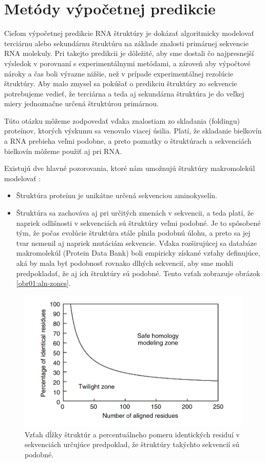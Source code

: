 \chapter{Metódy výpočetnej predikcie}
Cieľom výpočetnej predikcie RNA štruktúry je dokázať algoritmicky modelovať terciárnu alebo sekundárnu štruktúru na základe znalosti primárnej sekvencie RNA molekuly. Pri takejto predikcii je dôležité, aby sme dostali čo najpresnejší výsledok v porovnaní s experimentálnymi metódami, a zároveň aby výpočtové nároky a čas boli výrazne nižšie, než v prípade experimentálnej rezolúcie štruktúry. Aby malo zmysel sa pokúšať o predikciu štruktúry zo sekvencie potrebujeme vedieť, že terciárna a teda aj sekundárna štruktúra je do veľkej miery jednoznačne určená štruktúrou primárnou.  


\indent Túto otázku môžeme zodpovedať vďaka znalostiam zo skladania (foldingu) proteínov, ktorých výskumu sa venovalo viacej úsilia. Platí, že skladanie bielkovín a RNA prebieha veľmi podobne, a preto poznatky o štruktúrach a sekvenciách bielkovín môžeme použiť aj pri RNA. \cite{Moore99} 


\indent  Existujú dve hlavné pozorovania, ktoré nám umožnujú štruktúry makromolekúl modelovať  \cite{Jenny09}:
\begin{itemize}
\item Štruktúra proteínu je unikátne určená sekvenciou aminokyselín.
\item Štruktúra sa zachováva aj pri určitých zmenách v sekvencii, a teda platí, že napriek odlišnosti v sekvenciách sú štruktúry veľmi podobné. Je to spôsobené tým, že počas evolúcie štruktúra stále plnila podobnú úlohu, a preto sa jej tvar nemenil aj napriek mutáciám sekvencie. Vďaka rozširujúcej sa databáze makromolekúl (Protein Data Bank) boli empiricky získané vzťahy definujúce, aká by mala byť podobnosť rovnako dlhých sekvencií, aby sme mohli predpokladať, že aj ich štruktúry sú podobné. Tento vzťah zobrazuje obrázok  \autoref{obr01:aln-zones}.
\end{itemize}

\begin{figure}%
\includegraphics[width=\textwidth]{../img/zones_of_aln}
\caption{Vzťah dĺžky štruktúr a percentuálneho pomeru identických residuí v sekvenciách určujúce predpoklad, že štruktúry takýchto sekvencií sú podobné. \cite{Jenny09}}
\label{obr01:aln-zones}
\end{figure}

